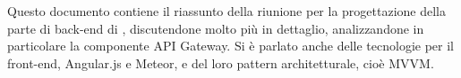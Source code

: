 Questo documento contiene il riassunto della riunione per la progettazione della parte di back-end di \progetto, discutendone molto più in dettaglio, analizzandone in particolare la componente API Gateway. Si è parlato anche delle tecnologie per il front-end, Angular.js e Meteor, e del loro pattern architetturale, cioè MVVM.